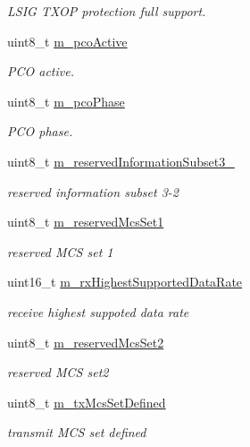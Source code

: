 \begin{DoxyCompactItemize}
\begin{DoxyCompactList}\small\item\em L\+S\+IG T\+X\+OP protection full support. \end{DoxyCompactList}\item 
uint8\+\_\+t \hyperlink{classns3_1_1HtOperation_ad005d1f81f7f57e5b7b0644d5efdc828}{m\+\_\+pco\+Active}
\begin{DoxyCompactList}\small\item\em P\+CO active. \end{DoxyCompactList}\item 
uint8\+\_\+t \hyperlink{classns3_1_1HtOperation_afacbca7654b7769c3eded3d3339457dc}{m\+\_\+pco\+Phase}
\begin{DoxyCompactList}\small\item\em P\+CO phase. \end{DoxyCompactList}\item 
uint8\+\_\+t \hyperlink{classns3_1_1HtOperation_a42e4e5921c9351e83a8f0f3316e14da3}{m\+\_\+reserved\+Information\+Subset3\+\_}
\begin{DoxyCompactList}\small\item\em reserved information subset 3-\/2 \end{DoxyCompactList}\item 
uint8\+\_\+t \hyperlink{classns3_1_1HtOperation_a7cab160c501ebb72cd4a4847dfda4b5d}{m\+\_\+reserved\+Mcs\+Set1}
\begin{DoxyCompactList}\small\item\em reserved M\+CS set 1 \end{DoxyCompactList}\item 
uint16\+\_\+t \hyperlink{classns3_1_1HtOperation_a56002f4602644ee677be9d36ca5f78ec}{m\+\_\+rx\+Highest\+Supported\+Data\+Rate}
\begin{DoxyCompactList}\small\item\em receive highest suppoted data rate \end{DoxyCompactList}\item 
uint8\+\_\+t \hyperlink{classns3_1_1HtOperation_aba163dff5b285a7186a43754f894a659}{m\+\_\+reserved\+Mcs\+Set2}
\begin{DoxyCompactList}\small\item\em reserved M\+CS set2 \end{DoxyCompactList}\item 
uint8\+\_\+t \hyperlink{classns3_1_1HtOperation_a9a9e9d670368ef55932943ab8d56ce2c}{m\+\_\+tx\+Mcs\+Set\+Defined}
\begin{DoxyCompactList}\small\item\em transmit M\+CS set defined \end{DoxyCompactList}\item 

\end{DoxyCompactItemize}
